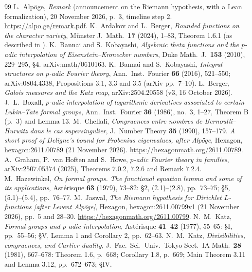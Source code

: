 \documentclass[11pt]{amsart}
\theoremstyle{definition}
\theoremstyle{remark}
\begin{document}
\begin{thebibliography}{99}
 L.~Alp\"oge, \emph{Remark} (announcement on the Riemann hypothesis, with a Lean formalization), 20 November 2026, p.~3, timeline step 2. \url{https://alpo.ge/remark.pdf}.
 K.~Ardakov and L.~Berger, \emph{Bounded functions on the character variety}, M\"unster J.\ Math.\ \textbf{17} (2024), 1--83, Theorem 1.6.1 (as described in \cite[Introduction]{Berger25}).
 K.~Bannai and S.~Kobayashi, \emph{Algebraic theta functions and the $p$-adic interpolation of Eisenstein--Kronecker numbers}, Duke Math.\ J.\ \textbf{153} (2010), 229--295, \S4. arXiv:math/0610163.
 K.~Bannai and S.~Kobayashi, \emph{Integral structures on $p$-adic Fourier theory}, Ann.\ Inst.\ Fourier \textbf{66} (2016), 521--550; arXiv:0804.4338, Propositions 3.1, 3.3 and 3.5 (arXiv pp.~7--10).
 L.~Berger, \emph{Galois measures and the Katz map}, arXiv:2504.20558 (v3, 16 October 2026).
 J.~L.~Boxall, \emph{$p$-adic interpolation of logarithmic derivatives associated to certain Lubin--Tate formal groups}, Ann.\ Inst.\ Fourier \textbf{36} (1986), no.~3, 1--27, Theorem B (p.~3) and Lemma 13.
 M.~Chellali, \emph{Congruences entre nombres de Bernoulli--Hurwitz dans le cas supersingulier}, J.\ Number Theory \textbf{35} (1990), 157--179.
 \emph{A short proof of Deligne's bound for Frobenius eigenvalues, after Alp\"oge}, Hexagon, hexagon:2611.00789 (21 November 2026). \url{https://hexagonmath.org/2611.00789}.
 A.~Graham, P.~van Hoften and S.~Howe, \emph{$p$-adic Fourier theory in families}, arXiv:2507.05374 (2025), Theorems 7.0.2, 7.2.6 and Remark 7.2.4.
 M.~Hazewinkel, \emph{On formal groups. The functional equation lemma and some of its applications}, Ast\'erisque \textbf{63} (1979), 73--82: \S2, (2.1)--(2.8), pp.~73--75; \S5, (5.1)--(5.4), pp.~76--77.
 M.~Jaswal, \emph{The Riemann hypothesis for Dirichlet $L$-functions [after Levent Alp\"oge]}, Hexagon, hexagon:2611.00799v1 (21 November 2026), pp.~5 and 28--30. \url{https://hexagonmath.org/2611.00799}.
 N.~M.~Katz, \emph{Formal groups and $p$-adic interpolation}, Ast\'erisque \textbf{41--42} (1977), 55--65: \S I, pp.~55--56; \S V, Lemma 1 and Corollary 2, pp.~62--63.
 N.~M.~Katz, \emph{Divisibilities, congruences, and Cartier duality}, J.\ Fac.\ Sci.\ Univ.\ Tokyo Sect.\ IA Math.\ \textbf{28} (1981), 667--678: Theorem 1.6, p.~668; Corollary 1.8, p.~669; Main Theorem 3.11 and Lemma 3.12, pp.~672--673; \S IV.

\end{thebibliography}
\end{document}
